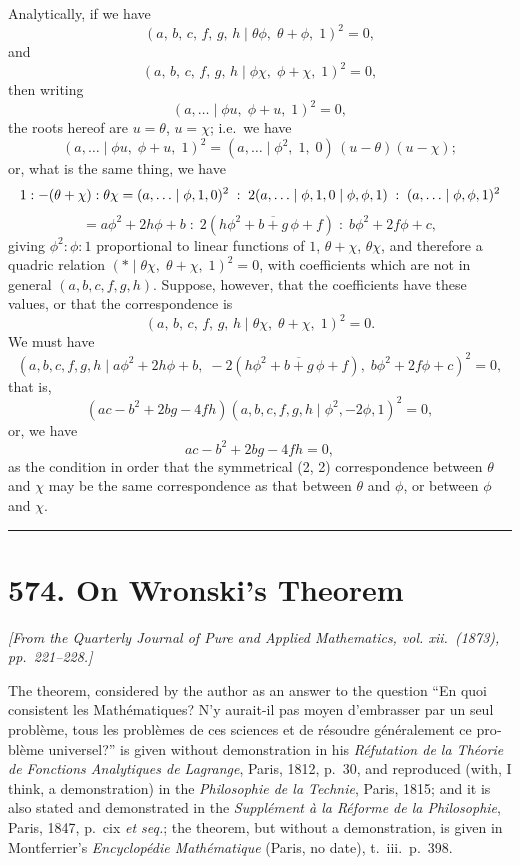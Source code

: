 \documentclass[11pt]{article}
\begin{document}
Analytically, if we have
\[
(a,\,b,\,c,\,f,\,g,\,h \mid \theta\phi,\; \theta+\phi,\; 1)^{2} = 0,
\]
and
\[
(a,\,b,\,c,\,f,\,g,\,h \mid \phi\chi,\; \phi+\chi,\; 1)^{2} = 0,
\]
then writing
\[
(a,\ldots \mid \phi u,\; \phi+u,\; 1)^{2} = 0,
\]
the roots hereof are $u=\theta$, $u=\chi$; i.e.\ we have
\[
(a,\ldots\mid \phi u,\; \phi+u,\; 1)^{2} = (a,\ldots\mid \phi^{2},\; 1,\; 0)\,(u-\theta)(u-\chi);
\]
or, what is the same thing, we have
\[ \resizebox{\textwidth}{!}{$\displaystyle
1 : -(\theta+\chi) : \theta\chi
= (a,\ldots\mid \phi,1,0)^{2}\;:\;
2(a,\ldots\mid \phi,1,0\mid \phi,\phi,1)\;:\;
(a,\ldots\mid \phi,\phi,1)^{2}
$} \]
\[
= a\phi^{2}+2h\phi+b\;:\;2(h\phi^{2}+\overline{b+g}\,\phi+f)\;:\;b\phi^{2}+2f\phi+c,
\]
giving $\phi^{2}:\phi:1$ proportional to linear functions of $1$, $\theta+\chi$, $\theta\chi$, and therefore a quadric relation $(*\mid \theta\chi,\;\theta+\chi,\;1)^{2}=0$, with coefficients which are not in general $(a, b, c, f, g, h)$. Suppose, however, that the coefficients have these values, or that the correspondence is
\[
(a,\,b,\,c,\,f,\,g,\,h \mid \theta\chi,\; \theta+\chi,\; 1)^{2} = 0.
\]
We must have
\[
(a,b,c,f,g,h \mid a\phi^{2}+2h\phi+b,\; -2(h\phi^{2}+\overline{b+g}\,\phi+f),\; b\phi^{2}+2f\phi+c)^{2}=0,
\]
that is,
\[
(ac-b^{2}+2bg-4fh)(a,b,c,f,g,h\mid \phi^{2},-2\phi,1)^{2}=0,
\]
or, we have
\[
ac - b^{2} + 2bg - 4fh = 0,
\]
as the condition in order that the symmetrical (2, 2) correspondence between $\theta$ and $\chi$ may be the same correspondence as that between $\theta$ and $\phi$, or between $\phi$ and $\chi$.

\bigskip
\hrule
\bigskip

\section*{574. On Wronski's Theorem}

\noindent\textit{[From the Quarterly Journal of Pure and Applied Mathematics, vol. xii.\ (1873), pp.\ 221--228.]}

\medskip

The theorem, considered by the author as an answer to the question ``\foreignlanguage{french}{En quoi consistent les Math\'ematiques? N'y aurait-il pas moyen d'embrasser par un seul probl\`eme, tous les probl\`emes de ces sciences et de r\'esoudre g\'en\'eralement ce probl\`eme universel?}'' is given without demonstration in his \textit{R\'efutation de la Th\'eorie de Fonctions Analytiques de Lagrange}, Paris, 1812, p.\ 30, and reproduced (with, I think, a demonstration) in the \textit{Philosophie de la Technie}, Paris, 1815; and it is also stated and demonstrated in the \textit{Suppl\'ement \`a la R\'eforme de la Philosophie}, Paris, 1847, p.\ cix \textit{et seq.}; the theorem, but without a demonstration, is given in Montferrier's \textit{Encyclop\'edie Math\'ematique} (Paris, no date), t.\ iii.\ p.\ 398.
\end{document}
